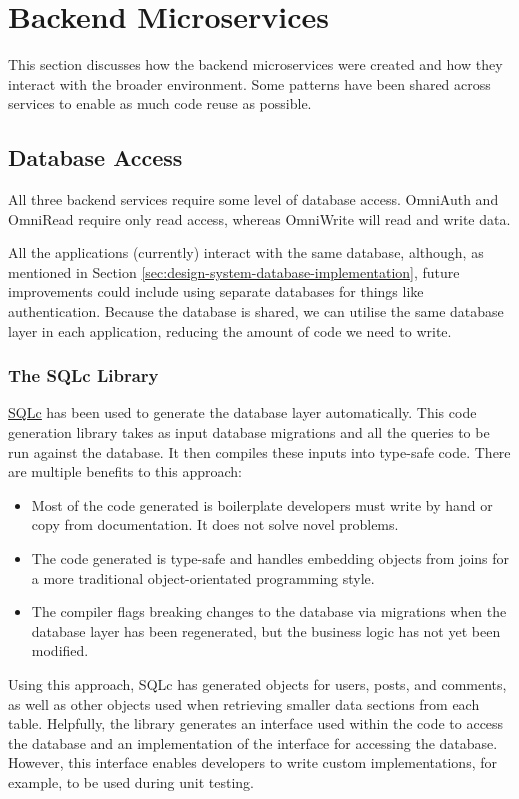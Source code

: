 \section{Backend Microservices}
\label{sec:impl-backend}
This section discusses how the backend microservices were created and how they interact with the broader environment.
Some patterns have been shared across services to enable as much code reuse as possible.

\subsection{Database Access}
\label{sec:impl-backend-db}
All three backend services require some level of database access. OmniAuth and OmniRead require only read access, whereas OmniWrite will read and write data. 

All the applications (currently) interact with the same database, although, as mentioned in Section \ref{sec:design-system-database-implementation}, future improvements could include using separate databases for things like authentication.
Because the database is shared, we can utilise the same database layer in each application, reducing the amount of code we need to write.

\subsubsection{The SQLc Library}
\underline{\href{https://sqlc.dev}{SQLc}} \nocite{sqlc} has been used to generate the database layer automatically.
This code generation library takes as input database migrations and all the queries to be run against the database.
It then compiles these inputs into type-safe code. There are multiple benefits to this approach:
\begin{itemize}
    \item Most of the code generated is boilerplate developers must write by hand or copy from documentation. It does not solve novel problems.
    \item The code generated is type-safe and handles embedding objects from joins for a more traditional object-orientated programming style. 
    \item The compiler flags breaking changes to the database via migrations when the database layer has been regenerated, but the business logic has not yet been modified.
\end{itemize}
Using this approach, SQLc has generated objects for users, posts, and comments, as well as other objects used when retrieving smaller data sections from each table.
Helpfully, the library generates an interface used within the code to access the database and an implementation of the interface for accessing the database.
However, this interface enables developers to write custom implementations, for example, to be used during unit testing. 

